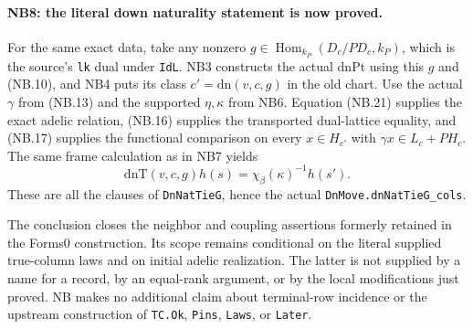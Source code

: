 \paragraph{NB8: the literal down naturality statement is now proved.}
For the same exact data, take any nonzero
$g\in\operatorname{Hom}_{k_P}(D_c/PD_c,k_P)$, which is the source's
\texttt{lk} dual under \texttt{IdL}. NB3 constructs the actual
$\mathrm{dnPt}$ using this $g$ and (NB.10), and NB4 puts its class
$c'=\mathrm{dn}(v,c,g)$ in the old chart. Use the actual $\gamma$
from (NB.13) and the supported $\eta,\kappa$ from NB6.
Equation (NB.21) supplies the exact adelic relation, (NB.16) supplies
the transported dual-lattice equality, and (NB.17) supplies the
functional comparison on every $x\in H_{c'}$ with
$\gamma x\in L_c+PH_c$. The same frame calculation as in NB7 yields
\[
                  \mathrm{dnT}(v,c,g)h(s)
                      =\chi_\beta(\kappa)^{-1}h(s'). \tag{NB.23}
\]
These are all the clauses of \texttt{DnNatTieG}, hence the actual
\texttt{DnMove.dnNatTieG\_cols}.

The conclusion closes the neighbor and coupling assertions formerly
retained in the Forms0 construction. Its scope remains conditional on
the literal supplied true-column laws and on initial adelic realization.
The latter is not supplied by a name for a record, by an equal-rank
argument, or by the local modifications just proved. NB makes no
additional claim about terminal-row incidence or the upstream
construction of \texttt{TC.Ok}, \texttt{Pins}, \texttt{Laws}, or
\texttt{Later}.
